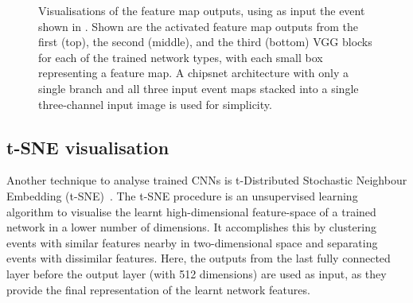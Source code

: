 \begin{figure}
{    }
    \quad
    \caption[Visualisations of trained feature map outputs]
    {Visualisations of the feature map outputs, using as input the event shown in
        . Shown are the activated feature map outputs from
        the first (top), the second (middle), and the third (bottom) VGG blocks for each of the
        trained network types, with each small box representing a feature map. A chipsnet
        architecture with only a single branch and all three input event maps stacked into a
        single three-channel input image is used for simplicity.}
    \label{fig:cnn_visualisations}
\end{figure}

\subsection{t-SNE visualisation} %
\label{sec:results_explain_tsne} %

Another technique to analyse trained CNNs is t-Distributed Stochastic Neighbour Embedding
(t-SNE)~\cite{maaten2008}. The t-SNE procedure is an unsupervised learning algorithm to visualise
the learnt high-dimensional feature-space of a trained network in a lower number of dimensions. It
accomplishes this by clustering events with similar features nearby in two-dimensional space and
separating events with dissimilar features. Here, the outputs from the last fully connected layer
before the output layer (with 512 dimensions) are used as input, as they provide the final
representation of the learnt network features.

